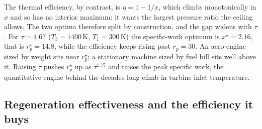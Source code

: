 The thermal efficiency, by contrast, is $\eta = 1 - 1/x$, which climbs
monotonically in $x$ and so has no interior maximum: it wants the largest
pressure ratio the ceiling allows. The two optima therefore split by
construction, and the gap widens with $\tau$. For $\tau = 4.67$ ($T_3 =
1400\,\si{\kelvin}$, $T_1 = 300\,\si{\kelvin}$) the specific-work optimum is
$x^\star = 2.16$, that is $r_p^\star = 14.8$, while the efficiency keeps
rising past $r_p = 30$. An aero-engine sized by weight sits near
$r_p^\star$; a stationary machine sized by fuel bill sits well above it.
Raising $\tau$ pushes $r_p^\star$ up as $\tau^{1.75}$ and raises the peak
specific work, the quantitative engine behind the decades-long climb in
turbine inlet temperature.



\subsection{Regeneration effectiveness and the efficiency it buys}

